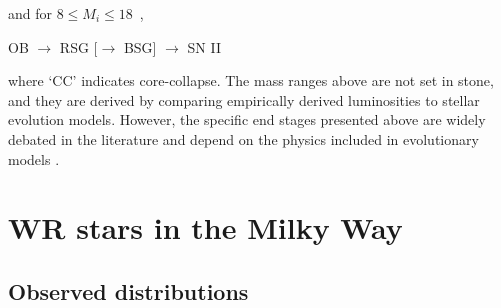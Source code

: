 and for $8 \le M_i \le 18\,$ \Msun{},

\centerline{OB $\longrightarrow$ RSG [$\longrightarrow$ BSG] $\longrightarrow$ SN II}

where `CC' indicates core-collapse. The mass ranges above are not set in stone, and they are derived by comparing empirically derived luminosities to stellar evolution models. However, the specific end stages presented above are widely debated in the literature and depend on the physics included in evolutionary models \citep[e.g., see][]{heger_how_2003,woosley_supernova_2006,2017LamersLevesque}. 

\section{WR stars in the Milky Way}


\subsection{Observed distributions}

